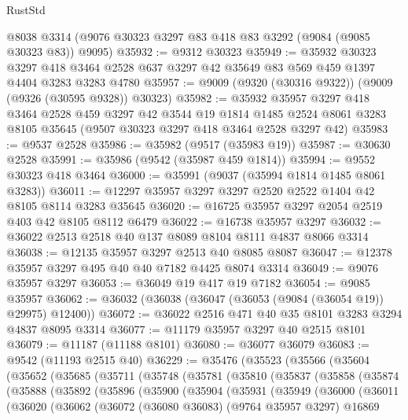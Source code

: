 \begin{lexlean}{RustStd}
\begin{coremodule}
    @8038
    @3314
    (@9076 @30323 @3297 @83 @418 @83 @3292 (@9084 (@9085 @30323 @83)) @9095)
@35932 := @9312 @30323
@35949 := @35932
    @30323
    @3297
    @418
    @3464
    @2528
    @637
    @3297
    @42
    @35649
    @83
    @569
    @459
    @1397
    @4404
    @3283
    @3283
    @4780
@35957 := @9009 (@9320 (@30316 @9322)) (@9009 (@9326 (@30595 @9328)) @30323)
@35982 := @35932
    @35957
    @3297
    @418
    @3464
    @2528
    @459
    @3297
    @42
    @3544
    @19
    @1814
    @1485
    @2524
    @8061
    @3283
    @8105
    @35645
    (@9507 @30323 @3297 @418 @3464 @2528 @3297 @42)
@35983 := @9537 @2528
@35986 := @35982 (@9517 (@35983 @19))
@35987 := @30630 @2528
@35991 := @35986 (@9542 (@35987 @459 @1814))
@35994 := @9552 @30323 @418 @3464
@36000 := @35991 (@9037 (@35994 @1814 @1485 @8061 @3283))
@36011 := @12297 @35957 @3297 @3297 @2520 @2522 @1404 @42 @8105 @8114 @3283 @35645
@36020 := @16725 @35957 @3297 @2054 @2519 @403 @42 @8105 @8112 @6479
@36022 := @16738 @35957 @3297
@36032 := @36022 @2513 @2518 @40 @137 @8089 @8104 @8111 @4837 @8066 @3314
@36038 := @12135 @35957 @3297 @2513 @40 @8085 @8087
@36047 := @12378 @35957 @3297 @495 @40 @40 @7182 @4425 @8074 @3314
@36049 := @9076 @35957 @3297
@36053 := @36049 @19 @417 @19 @7182
@36054 := @9085 @35957
@36062 := @36032 (@36038 (@36047 (@36053 (@9084 (@36054 @19)) @29975) @12400))
@36072 := @36022 @2516 @471 @40 @35 @8101 @3283 @3294 @4837 @8095 @3314
@36077 := @11179 @35957 @3297 @40 @2515 @8101
@36079 := @11187 (@11188 @8101)
@36080 := @36077 @36079
@36083 := @9542 (@11193 @2515 @40)
@36229 := @35476
    (@35523
      (@35566
        (@35604
          (@35652
            (@35685
              (@35711
                (@35748
                  (@35781
                    (@35810
                      (@35837
                        (@35858
                          (@35874
                            (@35888
                              (@35892
                                (@35896
                                  (@35900
                                    (@35904
                                      (@35931
                                        (@35949
                                          (@36000
                                            (@36011
                                              (@36020
                                                (@36062
                                                  (@36072
                                                    (@36080 @36083)
                                                    (@9764 @35957 @3297)
                                                    @16869

\end{coremodule}
\end{lexlean}
